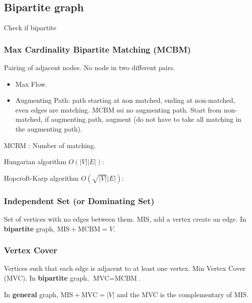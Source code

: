 \subsection{Bipartite graph}
Check if bipartite


\subsubsection{Max Cardinality Bipartite Matching (MCBM)}
Pairing of adjacent nodes. No node in two different pairs.
\begin{itemize}
  \item Max Flow.
  \item Augmenting Path: path starting at non matched, ending
    at non-matched, even edges are matching.
    MCBM ssi no augmenting path.
    Start from non-matched, if augmenting path, augment
    (do not have to take all matching in the augmenting path).
\end{itemize}
MCBM : Number of matching.

Hungarian algorithm $O(|V||E|)$:


Hopcroft-Karp algorithm $O(\sqrt{|V|}|E|)$:


\subsubsection{Independent Set (or Dominating Set)}
Set of vertices with no edges between them.
MIS, add a vertex create an edge.
In \textbf{bipartite} graph,
$\text{MIS} + \text{MCBM} = V$.

\subsubsection{Vertex Cover}
Vertices such that each edge is adjacent to at least one vertex.
Min Vertex Cover (MVC). In \textbf{bipartite} graph,
$\text{MVC} = \text{MCBM}$.

In \textbf{general} graph,
$\text{MIS} + \text{MVC} = |V|$ and the MVC is the complementary of MIS.

